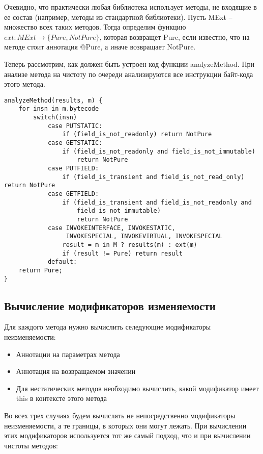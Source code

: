 Очевидно, что практически любая библиотека использует методы, не входящие в ее состав (например, методы из стандартной библиотеки). Пусть MExt -- множество всех таких методов. Тогда определим функцию $ext: MExt \rightarrow \{Pure, NotPure\}$, которая возвращет Pure, если известно, что на методе стоит аннотация @Pure, а иначе возвращает NotPure. 

Теперь рассмотрим, как должен быть устроен код функции analyzeMethod. При анализе метода на чистоту по очереди анализируются все инструкции байт-кода этого метода. 

\begin{lstlisting}[caption=Анализ чистоты методов, label=code:purity_analyze_method]
analyzeMethod(results, m) {
    for insn in m.bytecode 
		switch(insn) 
		    case PUTSTATIC:
		        if (field_is_not_readonly) return NotPure
		    case GETSTATIC:
		        if (field_is_not_readonly and field_is_not_immutable) 
		            return NotPure
		    case PUTFIELD:
		        if (field_is_transient and field_is_not_read_only) return NotPure
		    case GETFIELD:
		        if (field_is_transient and field_is_not_readonly and
		            field_is_not_immutable)        
		            return NotPure
		    case INVOKEINTERFACE, INVOKESTATIC, 
		         INVOKESPECIAL, INVOKEVIRTUAL, INVOKESPECIAL
		        result = m in M ? results(m) : ext(m)
		        if (result != Pure) return result
		    default:       
    return Pure;        
}
\end{lstlisting}

\subsection{Вычисление модификаторов изменяемости} 

Для каждого метода нужно вычислить селедующие модификаторы неизменяемости:
\begin{itemize}
    \item Аннотации на параметрах метода
    \item Аннотация на возвращаемом значении
    \item Для нестатических методов необходимо вычислить, какой модификатор имеет this в контексте этого метода
\end{itemize}

Во всех трех случаях будем вычислять не непосредственно модификаторы неизменяемости, а те границы, в которых они могут лежать. При вычислении этих модификаторов используется тот же самый подход, что и при вычислении чистоты методов:

